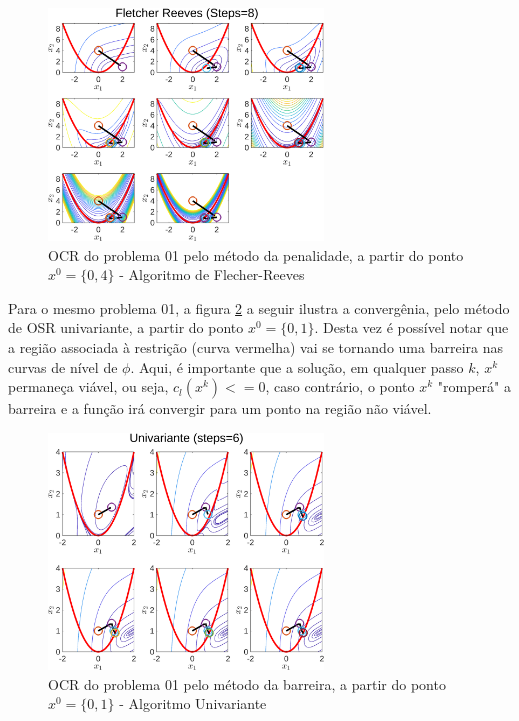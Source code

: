 \documentclass[10pt, a4paper]{article}
\begin{document}
\begin{figure}[H]
      \centering
      \includegraphics[width=0.65\textwidth]{fig02_P01_PEN_X2_FR.png}
      \caption{OCR do problema 01 pelo m\'etodo da penalidade, a partir do ponto $x^0=\{0,4\}$ - Algoritmo de Flecher-Reeves}
      \label{fig:fig02}
\end{figure}

Para o mesmo problema 01, a figura \ref{fig:fig03} a seguir ilustra a converg\^enia, pelo m\'etodo de OSR univariante, a partir do ponto $x^0=\{0,1\}$. Desta vez \'e poss\'ivel notar que a regi\~ao associada \`a restri\c c\~ao (curva vermelha) vai se tornando uma barreira nas curvas de n\'ivel de $\phi$. Aqui, \'e importante que a solu\c c\~ao, em qualquer passo $k$, $x^k$ permane\c ca vi\'avel, ou seja, $c_l(x^k)<=0$, caso contr\'ario, o ponto $x^k$ "romper\'a" a barreira e a fun\c c\~ao ir\'a convergir para um ponto na regi\~ao n\~ao vi\'avel.

\begin{figure}[H]
      \centering
      \includegraphics[width=0.65\textwidth]{fig03_P01_BAR_X1_UNI.png}
      \caption{OCR do problema 01 pelo m\'etodo da barreira, a partir do ponto $x^0=\{0,1\}$ - Algoritmo Univariante}
      \label{fig:fig03}
\end{figure}
\end{document}
